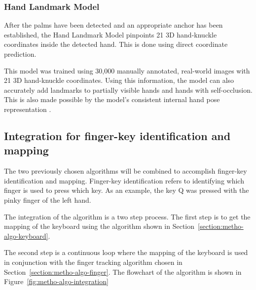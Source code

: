\documentclass{report}
\begin{document}
\subsubsection{Hand Landmark Model}
After the palms have been detected and an appropriate anchor has been
established, the Hand Landmark Model pinpoints 21 3D hand-knuckle coordinates
inside the detected hand. This is done using direct coordinate prediction.

This model was trained using 30,000 manually annotated, real-world images with
21 3D hand-knuckle coordinates. Using this information, the model can also
accurately add landmarks to partially visible hands and hands with
self-occlusion. This is also made possible by the model's consistent internal
hand pose representation \parencite{mediapipe-hands}.

\subsection{Integration for finger-key identification and mapping}

The two previously chosen algorithms will be combined to accomplish finger-key
identification and mapping. Finger-key identification refers to identifying
which finger is used to press which key. As an example, the key Q was pressed
with the pinky finger of the left hand.

The integration of the algorithm is a two step process. The first step is to get
the mapping of the keyboard using the algorithm shown in
Section~\ref{section:metho-algo-keyboard}.

The second step is a continuous loop where the mapping of the keyboard is used
in conjunction with the finger tracking algorithm chosen in
Section~\ref{section:metho-algo-finger}. The flowchart of the algorithm is shown
in Figure~\ref{fig:metho-algo-integration}
\end{document}
